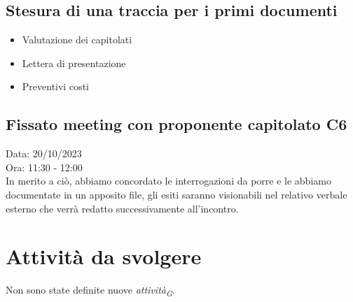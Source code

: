 \documentclass{article}
\begin{document}
        \subsection{Stesura di una traccia per i primi documenti}
            \begin{itemize}
                \item Valutazione dei capitolati
                \item Lettera di presentazione
                \item Preventivi costi
            \end{itemize}

    \subsection{Fissato meeting con proponente capitolato C6}
        Data: 20/10/2023 \\
        Ora: 11:30 - 12:00 \\
        In merito a ciò, abbiamo concordato le interrogazioni da porre e le abbiamo documentate in un apposito file, gli esiti saranno visionabili nel relativo verbale esterno che verrà redatto successivamente all'incontro.

\section{Attività da svolgere}
    Non sono state definite nuove \textit{attività}\textsubscript{\textit{G}}.
\end{document}
